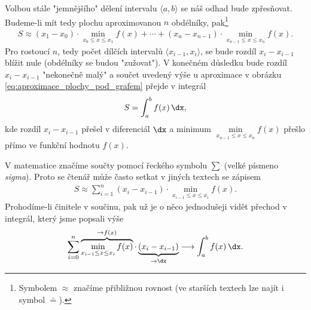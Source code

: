 Volbou stále "jemnějšího" dělení intervalu $\langle a,b \rangle$ se náš odhad bude zpřesňovat. Budeme-li mít tedy plochu aproximovanou $n$ obdélníky, pak\footnote{Symbolem $\approx$ značíme přibližnou rovnost (ve starších textech lze najít i symbol $\doteq$).}
\begin{align}
\label{eq:aproximace_plochy_pod_grafem}
S \approx (x_1-x_0) \cdot \min\limits_{x_{0} \leq x \leq x_1}{f(x)} +\cdots + (x_n-x_{n-1}) \cdot \min\limits_{x_{n-1} \leq x \leq x_n}{f(x)}.
\end{align}
Pro rostoucí $n$, tedy počet dílčích intervalů $\langle x_{i-1},x_i \rangle$, se bude rozdíl $x_i-x_{i-1}$ blížit nule (obdélníky se budou "zužovat"). V konečném důsledku bude rozdíl $x_i-x_{i-1}$ "nekonečně malý" a součet uvedený výše u aproximace v obrázku \ref{eq:aproximace_plochy_pod_grafem} přejde v integrál
\begin{align*}
S=\int_{a}^{b}{f(x)\,\dx},
\end{align*}
kde rozdíl $x_i-x_{i-1}$ přešel v diferenciál $\dx$ a minimum $\min\limits_{x_{n-1} \leq x \leq x_n}{f(x)}$ přešlo přímo ve funkční hodnotu $f(x)$.\par
V matematice značíme součty pomocí řeckého symbolu $\sum$ (velké písmeno \emph{sigma}). Proto se čtenář může často setkat v jiných textech se zápisem
\begin{align*}
S \approx \sum_{i=1}^{n}{(x_i-x_{i-1}) \cdot \min\limits_{x_{i-1} \leq x \leq x_i}{f(x)}}.
\end{align*}
Prohodíme-li činitele v součinu, pak už je o něco jednodušeji vidět přechod v integrál, který jsme popsali výše
\begin{align*}
\sum_{i=0}^{n}{\overbrace{\min\limits_{x_{i-1} \leq x \leq x_i}{f(x)}}^{\rightarrow f(x)} \cdot \underbrace{(x_i-x_{i-1})}_{\rightarrow \dx}} \longrightarrow \int_{a}^{b}{f(x)\,\dx}.
\end{align*}

